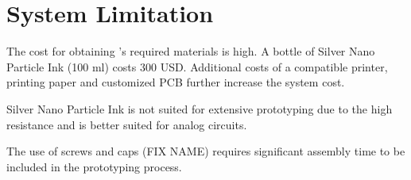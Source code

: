\section{System Limitation}

The cost for obtaining \papertitle's required materials is high. A bottle of Silver Nano Particle Ink (100 ml)  costs 300 USD. Additional costs of a compatible printer, printing paper and customized PCB further increase the system cost.


Silver Nano Particle Ink is not suited for extensive prototyping due to the high resistance and is better suited for analog circuits.


The use of screws and caps (FIX NAME) requires significant assembly time to be included in the prototyping process.